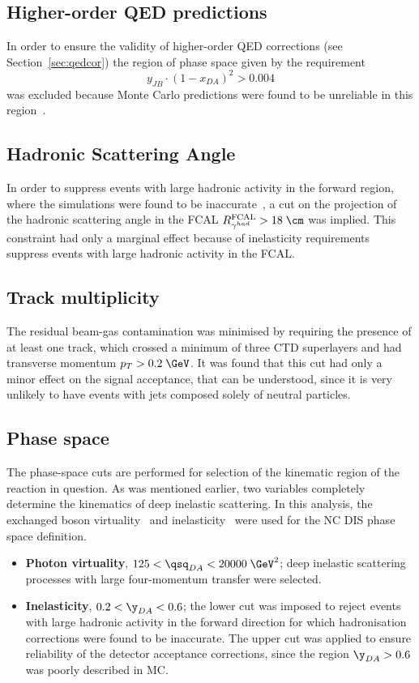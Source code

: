 \subsection{Higher-order QED predictions}
\label{subsec:qedcorcut}
In order to ensure the validity of higher-order QED corrections (see Section~\ref{sec:qedcor}) the region of phase space given by the requirement 
\begin{equation}
y_{JB}\cdot\left(1-x_{DA}\right)^2>0.004
\end{equation}
was excluded because Monte Carlo predictions were found to be unreliable in this region~\cite{cpc:81:381}.

\subsection{Hadronic Scattering Angle}
\label{subsec:gammahadcut}
In order to suppress events with large hadronic activity in the forward region, where the simulations were found to be inaccurate~\cite{thesis:jose:2003}, a cut on the projection of the hadronic scattering angle in the FCAL $R^\text{FCAL}_{\gamma^{had}} > 18\;\cm$ was implied. This constraint had only a marginal effect because of inelasticity requirements suppress events with large hadronic activity in the FCAL.

\subsection{Track multiplicity}
\label{subsec:trackmultcut}
The residual beam-gas contamination was minimised by requiring the presence of at least one track, which crossed a minimum of three CTD superlayers and had transverse momentum $p_T>0.2\;\GeV$. It was found that this cut had only a minor effect on the signal acceptance, that can be understood, since it is very unlikely to have events with jets composed solely of neutral particles.

\subsection{Phase space}
\label{subsec:phasespace}
The phase-space cuts are performed for selection of the kinematic region of the reaction in question. As was mentioned earlier, two variables completely determine the kinematics of deep inelastic scattering. In this analysis, the exchanged boson virtuality \qsq~and inelasticity \y~were used for the NC DIS phase space definition.
\begin{itemize}
	\item \textbf{Photon virtuality}, $125 < \qsq_{DA} < 20000\;\GeV^2$;  deep inelastic scattering processes with large four-momentum transfer were selected.
	\item \textbf{Inelasticity}, $0.2 < \y_{DA} < 0.6$; the lower cut was imposed to reject events with large hadronic activity in the forward direction for which hadronisation corrections were found to be inaccurate. The upper cut was applied to ensure reliability of the detector acceptance corrections, since the region $\y_{DA} > 0.6$ was poorly described in MC.
\end{itemize}


